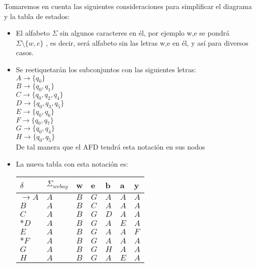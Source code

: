 \documentclass[spanish]{article}
\begin{document}
Tomaremos en cuenta las siguientes consideraciones para simplificar el diagrama y la tabla de estados:\\ 
\begin{itemize}

\item{El alfabeto $\Sigma$ sin algunos caracteres en él, por ejemplo w,e se pondrá 
$\Sigma \setminus \{ w, e \} $ , es decir, será alfabeto sin las letras w,e en él, y así para diversos casos.}

\item{Se reetiquetarán los subconjuntos con las siguientes letras:\\
$A \rightarrow \{ q_{0} \} $ \\
$B \rightarrow \{q_{0},q_{1}\}$ \\
$C \rightarrow \{q_{0},q_{2},q_{4}\}$ \\
$D \rightarrow \{q_{0},q_{3},q_{5}\}$ \\
$E \rightarrow \{q_{0},q_{6}\}$ \\
$F \rightarrow  \{q_{0},q_{7}\}$ \\
$G \rightarrow \{q_{0},q_{4}\}$ \\
$H \rightarrow \{q_{0},q_{5}\}$ \\
De tal manera que el AFD tendrá esta notación en sus nodos}

\item{
La nueva tabla con esta notación es:\hfill \break

\begin{table}[H]
\begin{tabular}{l|llllll}
$\delta$ & $\Sigma_{webay}$ & w & e & b & a & y  \\ \hline
$\rightarrow A$   &   $A $    & $B$  & $G$   & $A $   & $A $   & $A $ \\
$B$  &   $A $    & $B$  & $C$  & $A $  &  $A $ &  $A $ \\
$C$    &   $A $    & $B$ & $G$  & $ D$  &  $A $ &  $A $  \\
$* D$    &   $A $    & $B$  & $G$  & $A$  &  $E$  &  $A $  \\
$E$    &   $A $    & $B$ & $G$  & $A$  &  $A$ &  $ F$  \\
$* F$   &   $A $    & $B$  & $G$  & $A$  &  $A $ &  $A $  \\
$G$    &   $A $    & $B$  & $G$   & $H$  & $A $  & $A $    \\ 
$H$ &   $A $    & $B$  & $G$ & $A$ &  $E$ & $A$
\end{tabular}
\end{table}

}

\end{itemize}
\end{document}
